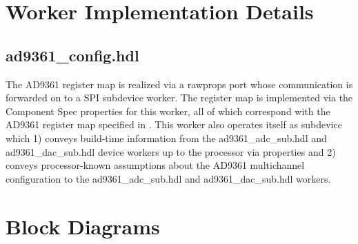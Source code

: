 \documentclass{article}
\def\comp{ad9361\_config}
\begin{document}
\section*{Worker Implementation Details}
\subsection*{\comp.hdl}
The AD9361 register map is realized via a rawprops port whose communication is forwarded on to a SPI subdevice worker. The register map is implemented via the Component Spec properties for this worker, all of which correspond with the AD9361 register map specified in \cite{adi_ug671}. This worker also operates itself as subdevice which 1) conveys build-time information from the ad9361\_adc\_sub.hdl and ad9361\_dac\_sub.hdl device workers up to the processor via properties and 2) conveys processor-known assumptions about the AD9361 multichannel configuration to the ad9361\_adc\_sub.hdl and ad9361\_dac\_sub.hdl workers.

\section*{Block Diagrams}
\end{document}
